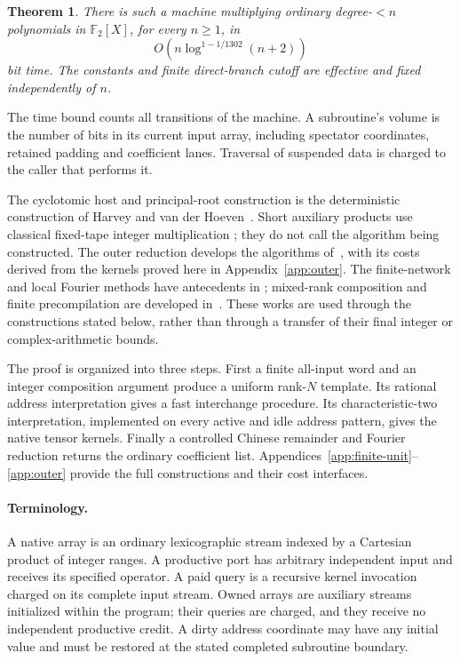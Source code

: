 \documentclass[11pt]{article}
\newcommand{\F}{\mathbb F}
\newcommand{\Oh}{O}
\newtheorem{theorem}{Theorem}
\begin{document}
\begin{theorem}\label{thm:main}
There is such a machine multiplying ordinary degree-$<n$ polynomials in
$\F_2[X]$, for every $n\ge1$, in
\[\Oh\!\left(n\log^{1-1/1302}(n+2)\right)\]
bit time. The constants and finite direct-branch cutoff are effective
and fixed independently of $n$.
\end{theorem}

The time bound counts all transitions of the machine. A subroutine's
volume is the number of bits in its current input array, including
spectator coordinates, retained padding and coefficient lanes. Traversal
of suspended data is charged to the caller that performs it.

The cyclotomic host and principal-root construction is the deterministic
construction of Harvey and van der Hoeven~\cite[Propositions 3.4,3.8]{host}.
Short auxiliary products use classical fixed-tape integer multiplication
\cite{ss}; they do not call the algorithm being constructed. The outer
reduction develops the algorithms of~\cite{release}, with its costs
derived from the kernels proved here in Appendix~\ref{app:outer}.
The finite-network and local Fourier methods have antecedents in
\cite{swap,local}; mixed-rank composition and finite precompilation are
developed in~\cite{sussman,mixed-precompile,five-stage}.
These works are used through the constructions stated below, rather than
through a transfer of their final integer or complex-arithmetic bounds.

The proof is organized into three steps. First a finite all-input word
and an integer composition argument produce a uniform rank-$N$ template.
Its rational address interpretation gives a fast interchange procedure.
Its characteristic-two interpretation, implemented on every active and
idle address pattern, gives the native tensor kernels. Finally a
controlled Chinese remainder and Fourier reduction returns the ordinary
coefficient list. Appendices~\ref{app:finite-unit}--\ref{app:outer}
provide the full constructions and their cost interfaces.

\paragraph{Terminology.}
A native array is an ordinary lexicographic stream indexed by a Cartesian
product of integer ranges. A productive port has arbitrary independent
input and receives its specified operator. A paid query is a recursive
kernel invocation charged on its complete input stream. Owned arrays
are auxiliary streams initialized within the program; their queries
are charged, and they receive no independent productive credit. A dirty
address coordinate may have any initial value and must be restored at
the stated completed subroutine boundary.
\end{document}
